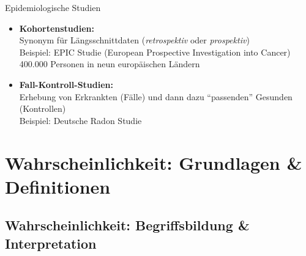 \documentclass[
  10pt,
  ignorenonframetext,
]{beamer}
\begin{document}
\begin{frame}{Epidemiologische Studien}
\protect\hypertarget{epidemiologische-studien}{}
\begin{itemize}
\item
  \textbf{Kohortenstudien:}\\
  Synonym für Längsschnittdaten (\emph{retrospektiv} oder
  \emph{prospektiv})\\
  Beispiel: EPIC Studie (European Prospective Investigation into
  Cancer)\\
  400.000 Personen in neun europäischen Ländern
\item
  \textbf{Fall-Kontroll-Studien:}\\
  Erhebung von Erkrankten (Fälle) und dann dazu ``passenden'' Gesunden
  (Kontrollen)\\
  Beispiel: Deutsche Radon Studie
\end{itemize}
\end{frame}

\hypertarget{wahrscheinlichkeit-grundlagen-definitionen}{%
\section{Wahrscheinlichkeit: Grundlagen \&
Definitionen}\label{wahrscheinlichkeit-grundlagen-definitionen}}

\hypertarget{wahrscheinlichkeit-begriffsbildung-interpretation}{%
\subsection{Wahrscheinlichkeit: Begriffsbildung \&
Interpretation}\label{wahrscheinlichkeit-begriffsbildung-interpretation}}
\end{document}
